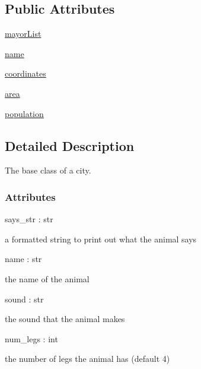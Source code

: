 \subsection*{Public Attributes}
\begin{DoxyCompactItemize}
\item 
\hyperlink{classpipver_1_1helloworld_1_1City_a844a3e3930823b05e6ffab5240b597f6}{mayor\+List}
\item 
\hyperlink{classpipver_1_1helloworld_1_1City_ab74e6bf80237ddc4109968cedc58c151}{name}
\item 
\hyperlink{classpipver_1_1helloworld_1_1City_ac1c6a62b7442feaba78b51d0a354abad}{coordinates}
\item 
\hyperlink{classpipver_1_1helloworld_1_1City_a4329d2992f02e00a6e706a5443269afc}{area}
\item 
\hyperlink{classpipver_1_1helloworld_1_1City_ae32f37c2558fc294ddfd35a3def3e180}{population}
\end{DoxyCompactItemize}


\subsection{Detailed Description}
The base class of a city. 

\subsubsection*{Attributes }


\begin{DoxyItemize}
\item says\+\_\+str \+: str
\begin{DoxyItemize}
\item a formatted string to print out what the animal says
\end{DoxyItemize}
\item name \+: str
\begin{DoxyItemize}
\item the name of the animal
\end{DoxyItemize}
\item sound \+: str
\begin{DoxyItemize}
\item the sound that the animal makes
\end{DoxyItemize}
\item num\+\_\+legs \+: int
\begin{DoxyItemize}
\item the number of legs the animal has (default 4)
\end{DoxyItemize}
\end{DoxyItemize}

